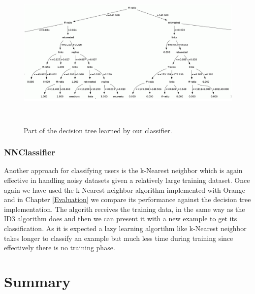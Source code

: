 \begin{figure}[htbp]
  \begin{center}
    \includegraphics[height=3in, width=6in]{tree}
    \caption{Part of the decision tree learned by our classifier.}
    \label{Tree}
  \end{center}
\end{figure} 

\subsubsection{NNClassifier}
Another approach for classifying users is the k-Nearest neighbor which is again effective in handling noisy datasets given a relatively large training dataset. Once again we have used the k-Nearest neighbor algorithm implemented with Orange and in Chapter \ref{Evaluation} we compare its performance against the decision tree implementation. The algorith receives the training data, in the same way as the ID3 algorithm does and then we can present it with a new example to get its classification. As it is expected a lazy learning algortihm like k-Nearest neighbor takes longer to classify an example but much less time during training since effectively there is no training phase.   

\section{Summary}




